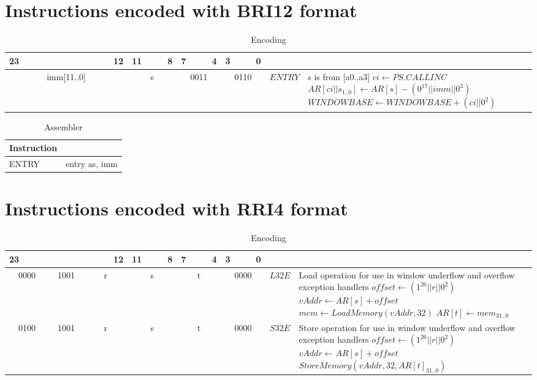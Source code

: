 \section*{Instructions encoded with BRI12 format}
\begin{longtable}{llllllllllllllllllllllll  p{1cm}  p{7cm} | }
	\caption{Encoding\label{long}}\\
	23 & & & & & & & & & & & 12 & 11 & & & 8 & 7 & & & 4 & 3 & & & 0 & &
	\multicolumn{1}{c}{}\\
	\hline
	\multicolumn{12}{|c|}{imm[11..0]} & \multicolumn{4}{c|}{s} & \multicolumn{4}{c|}{0011} & \multicolumn{4}{c|}{0110} & \multicolumn{1}{c|}{$ENTRY$} & s is from [a0..a3] \newline $ci \leftarrow PS.CALLINC$ \newline $AR[ci||s_{1..0}] \leftarrow AR[s] - (0^{17}||imm||0^3)$ \newline $WINDOWBASE \leftarrow WINDOWBASE + (ci||0^2)$ \\ \hline
\end{longtable}

\begin{longtable}{|p{5cm}|p{5cm}|}
	\caption{Assembler\label{long}}\\		
	\hline
	Instruction & \\
	\hline
	ENTRY & entry as, imm\\ \hline
\end{longtable}

\section*{Instructions encoded with RRI4 format}
\begin{longtable}{llllllllllllllllllllllll  p{1cm}  p{7cm} | }
	\caption{Encoding\label{long}}\\
	23 & & & & & & & & & & & 12 & 11 & & & 8 & 7 & & & 4 & 3 & & & 0 & &
	\multicolumn{1}{c}{}\\
	\hline
	\multicolumn{4}{|c|}{0000} & \multicolumn{4}{c|}{1001} & \multicolumn{4}{c|}{r} & \multicolumn{4}{c|}{s} & \multicolumn{4}{c|}{t} & \multicolumn{4}{c|}{0000} & \multicolumn{1}{c|}{$L32E$} & Load operation for use in window underflow and overflow exception handlers \newline $offset \leftarrow (1^{26}||r||0^2)$ \newline $vAddr \leftarrow AR[s] + offset$ \newline $mem \leftarrow LoadMemory(vAddr, 32)$ \newline $AR[t] \leftarrow mem_{31..0}$ \\ \hline
	\multicolumn{4}{|c|}{0100} & \multicolumn{4}{c|}{1001} & \multicolumn{4}{c|}{r} & \multicolumn{4}{c|}{s} & \multicolumn{4}{c|}{t} & \multicolumn{4}{c|}{0000} & \multicolumn{1}{c|}{$S32E$} & Store operation for use in window underflow and overflow exception handlers \newline $offset \leftarrow (1^{26}||r||0^2)$ \newline $vAddr \leftarrow AR[s] + offset$ \newline $StoreMemory(vAddr, 32, AR[t]_{31..0})$ \\ \hline
\end{longtable}

